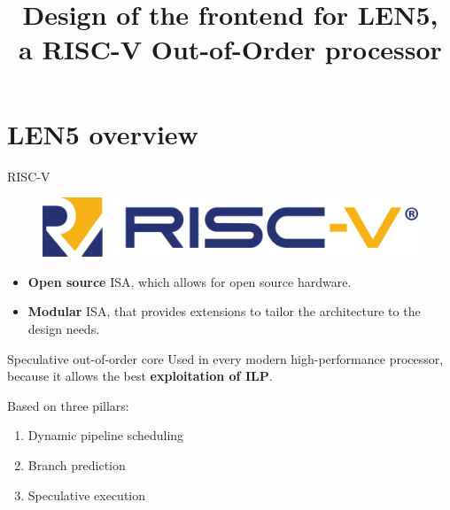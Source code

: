 \documentclass{beamer}
\title{Design of the frontend for LEN5,\\a RISC-V Out-of-Order processor}
\begin{document}
\begin{frame}[plain]
  \maketitle
\end{frame}
\addtocounter{framenumber}{-1}

\section{LEN5 overview}

\begin{frame}{RISC-V}
  \begin{figure}
    \centering
    \includegraphics[width=.7\textwidth]{img/riscv.png}
  \end{figure}

  \begin{itemize}[<+->]
    \item \textbf{Open source} ISA, which allows for open source hardware.
    \item \textbf{Modular} ISA, that provides extensions to tailor the architecture to the design needs.
  \end{itemize}
\end{frame}

\begin{frame}{Speculative out-of-order core}
  Used in every modern high-performance processor, because it allows the best \textbf{exploitation of ILP}.
  \pause

  Based on three pillars:
  \begin{enumerate}[<+->]
    \item Dynamic pipeline scheduling
    \item Branch prediction
    \item Speculative execution
  \end{enumerate}

\end{frame}
\end{document}
